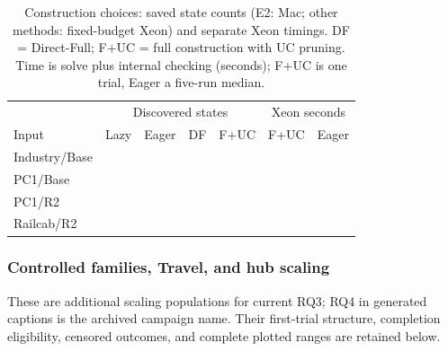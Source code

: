 \documentclass[11pt]{article}
\begin{document}
\begin{table}[!htbp]
\caption{Construction choices: saved state counts (E2: Mac; other methods: fixed-budget Xeon) and separate Xeon timings. DF = Direct-Full; F+UC = full construction with UC pruning. Time is solve plus internal checking (seconds); F+UC is one trial, Eager a five-run median.}
\label{tab:e2-choices}
\centering\small
\begin{tabular}{@{}lrrrrrr@{}}\toprule
 & \multicolumn{4}{c}{Discovered states} & \multicolumn{2}{c}{Xeon seconds}\\
Input & Lazy & Eager & DF & F+UC & F+UC & Eager\\\midrule
Industry/Base & \VThreeETwoIndustryBaseStatesLazy{} & \VThreeETwoIndustryBaseStatesEager{} & \VThreeETwoIndustryBaseStatesDF{} & \VThreeETwoIndustryBaseStatesFullUC{} & \VThreeETwoIndustryBaseXeonFullUCSec{} & \VThreeETwoIndustryBaseXeonEagerMedianSec{}\\
PC1/Base & \VThreeETwoPCOneBaseStatesLazy{} & \VThreeETwoPCOneBaseStatesEager{} & \VThreeETwoPCOneBaseStatesDF{} & \VThreeETwoPCOneBaseStatesFullUC{} & \VThreeETwoPCOneBaseXeonFullUCSec{} & \VThreeETwoPCOneBaseXeonEagerMedianSec{}\\
PC1/R2 & \VThreeETwoPCOneRTwoStatesLazy{} & \VThreeETwoPCOneRTwoStatesEager{} & \VThreeETwoPCOneRTwoStatesDF{} & \VThreeETwoPCOneRTwoStatesFullUC{} & \VThreeETwoPCOneRTwoXeonFullUCSec{} & \VThreeETwoPCOneRTwoXeonEagerMedianSec{}\\
Railcab/R2 & \VThreeETwoRailcabRTwoStatesLazy{} & \VThreeETwoRailcabRTwoStatesEager{} & \VThreeETwoRailcabRTwoStatesDF{} & \VThreeETwoRailcabRTwoStatesFullUC{} & \VThreeETwoRailcabRTwoXeonFullUCSec{} & \VThreeETwoRailcabRTwoXeonEagerMedianSec{}\\\bottomrule
\end{tabular}
\end{table}



\clearpage
\subsubsection{Controlled families, Travel, and hub scaling}
\label{supp:scaling}
These are additional scaling populations for current RQ3; RQ4 in generated captions is the archived campaign name. Their first-trial structure, completion eligibility, censored outcomes, and complete plotted ranges are retained below.

\begingroup
\let\FGClearPage\clearpage
\def\clearpage{\let\clearpage\FGClearPage}
\endgroup
{}
\end{document}
